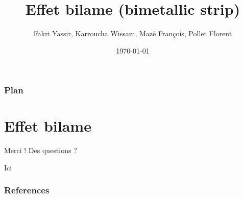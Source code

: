 \documentclass[10pt]{beamer}
\title[Effet bilame]{Effet bilame (bimetallic strip)}
\author[Groupe 4]{Fakri Yassir, Karroucha Wissam, Mazé François, Pollet Florent} %
\institute[Mines Paris] %
{
Mines ParisTech \\ %
}
\date{\today} %
\begin{document}
\begin{frame}
\titlepage %
\begin{figure}
    \centering
\end{figure}
\end{frame}

\begin{frame}
\frametitle{Plan} %
\tableofcontents %
\end{frame}

\section{Effet bilame} %



\begin{frame}
    \Huge{\centerline{Merci ! Des questions ?}}
    Ici \autocite{canouiHistoryPrinciplesVaccination2019}
\end{frame}


%    
%    
\begin{frame}[t,allowframebreaks]
    \frametitle{References}
    \printbibliography
    \end{frame}


%
    
    
\end{document}
